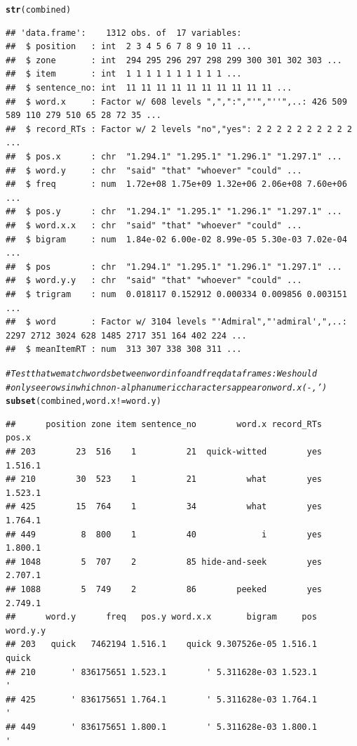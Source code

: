 \documentclass{article}\usepackage[]{graphicx}\usepackage[]{color}
\makeatletter
\newcommand{\hlcom}[1]{\textcolor[rgb]{0.678,0.584,0.686}{\textit{#1}}}%
\newcommand{\hlopt}[1]{\textcolor[rgb]{0,0,0}{#1}}%
\newcommand{\hlstd}[1]{\textcolor[rgb]{0.345,0.345,0.345}{#1}}%
\newcommand{\hlkwd}[1]{\textcolor[rgb]{0.737,0.353,0.396}{\textbf{#1}}}%
\newenvironment{kframe}{%
 \def\at@end@of@kframe{}%
 \ifinner\ifhmode%
  \def\at@end@of@kframe{\end{minipage}}%
  \begin{minipage}{\columnwidth}%
 \fi\fi%
 \def\FrameCommand##1{\hskip\@totalleftmargin \hskip-\fboxsep
 \colorbox{shadecolor}{##1}\hskip-\fboxsep
     \hskip-\linewidth \hskip-\@totalleftmargin \hskip\columnwidth}%
 \MakeFramed {\advance\hsize-\width
   \@totalleftmargin\z@ \linewidth\hsize
   \@setminipage}}%
 {\par\unskip\endMakeFramed%
 \at@end@of@kframe}
\newenvironment{knitrout}{}{} %
\makeatother
\begin{document}
\begin{knitrout}
\begin{kframe}
\begin{alltt}
\hlkwd{str}\hlstd{(combined)}
\end{alltt}
\begin{verbatim}
## 'data.frame':	1312 obs. of  17 variables:
##  $ position   : int  2 3 4 5 6 7 8 9 10 11 ...
##  $ zone       : int  294 295 296 297 298 299 300 301 302 303 ...
##  $ item       : int  1 1 1 1 1 1 1 1 1 1 ...
##  $ sentence_no: int  11 11 11 11 11 11 11 11 11 11 ...
##  $ word.x     : Factor w/ 608 levels ",",":","'","''",..: 426 509 589 110 279 510 65 28 72 35 ...
##  $ record_RTs : Factor w/ 2 levels "no","yes": 2 2 2 2 2 2 2 2 2 2 ...
##  $ pos.x      : chr  "1.294.1" "1.295.1" "1.296.1" "1.297.1" ...
##  $ word.y     : chr  "said" "that" "whoever" "could" ...
##  $ freq       : num  1.72e+08 1.75e+09 1.32e+06 2.06e+08 7.60e+06 ...
##  $ pos.y      : chr  "1.294.1" "1.295.1" "1.296.1" "1.297.1" ...
##  $ word.x.x   : chr  "said" "that" "whoever" "could" ...
##  $ bigram     : num  1.84e-02 6.00e-02 8.99e-05 5.30e-03 7.02e-04 ...
##  $ pos        : chr  "1.294.1" "1.295.1" "1.296.1" "1.297.1" ...
##  $ word.y.y   : chr  "said" "that" "whoever" "could" ...
##  $ trigram    : num  0.018117 0.152912 0.000334 0.009856 0.003151 ...
##  $ word       : Factor w/ 3104 levels "'Admiral","'admiral',",..: 2297 2712 3024 628 1485 2717 351 164 402 224 ...
##  $ meanItemRT : num  313 307 338 308 311 ...
\end{verbatim}
\begin{alltt}
\hlcom{# Test that we match words between wordinfo and freq dataframes: We should}
\hlcom{# only see rows in which non-alphanumeric characters appear on word.x (-,')}
\hlkwd{subset}\hlstd{(combined, word.x} \hlopt{!=} \hlstd{word.y)}
\end{alltt}
\begin{verbatim}
##      position zone item sentence_no        word.x record_RTs   pos.x
## 203        23  516    1          21  quick-witted        yes 1.516.1
## 210        30  523    1          21          what        yes 1.523.1
## 425        15  764    1          34          what        yes 1.764.1
## 449         8  800    1          40             i        yes 1.800.1
## 1048        5  707    2          85 hide-and-seek        yes 2.707.1
## 1088        5  749    2          86        peeked        yes 2.749.1
##      word.y      freq   pos.y word.x.x       bigram     pos word.y.y
## 203   quick   7462194 1.516.1    quick 9.307526e-05 1.516.1    quick
## 210       ' 836175651 1.523.1        ' 5.311628e-03 1.523.1        '
## 425       ' 836175651 1.764.1        ' 5.311628e-03 1.764.1        '
## 449       ' 836175651 1.800.1        ' 5.311628e-03 1.800.1        '

\end{verbatim}
\end{kframe}
\end{knitrout}
\end{document}
